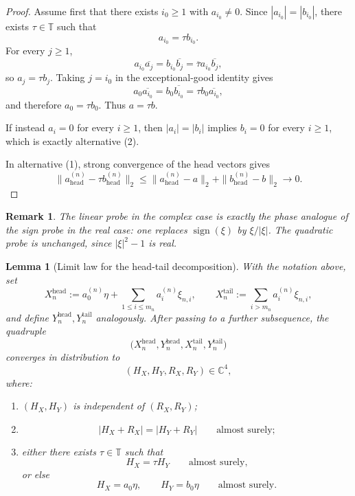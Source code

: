 \documentclass[11pt]{amsart}
\newtheorem{lemma}[theorem]{Lemma}
\newtheorem{remark}[theorem]{Remark}
\newcommand{\C}{\mathbb{C}}
\newcommand{\T}{\mathbb{T}}
\begin{document}
\begin{proof}
Assume first that there exists $i_0\ge 1$ with $a_{i_0}\ne 0$.  Since
$|a_{i_0}|=|b_{i_0}|$, there exists $\tau\in\T$ such that
\[
  a_{i_0}=\tau b_{i_0}.
\]
For every $j\ge 1$,
\[
  a_{i_0}\overline{a_j}
  =
  b_{i_0}\overline{b_j}
  =
  \overline{\tau}a_{i_0}\overline{b_j},
\]
so $a_j=\tau b_j$.  Taking $j=i_0$ in the exceptional-good identity gives
\[
  a_0\overline{a_{i_0}}
  =
  b_0\overline{b_{i_0}}
  =
  \tau b_0\overline{a_{i_0}},
\]
and therefore $a_0=\tau b_0$.  Thus $a=\tau b$.

If instead $a_i=0$ for every $i\ge 1$, then $|a_i|=|b_i|$ implies
$b_i=0$ for every $i\ge 1$, which is exactly alternative \textup{(2)}.

In alternative \textup{(1)}, strong convergence of the head vectors gives
\[
  \|a^{(n)}_{\mathrm{head}}-\tau b^{(n)}_{\mathrm{head}}\|_2
  \le
  \|a^{(n)}_{\mathrm{head}}-a\|_2
  +
  \|b^{(n)}_{\mathrm{head}}-b\|_2
  \longrightarrow 0.
\]
\end{proof}

\begin{remark}
The linear probe in the complex case is exactly the phase analogue of the sign
probe in the real case: one replaces $\operatorname{sign}(\xi)$ by
$\xi/|\xi|$.  The quadratic probe is unchanged, since $|\xi|^2-1$ is real.
\end{remark}

\begin{lemma}[Limit law for the head-tail decomposition]
\label{lem:limit-law}
With the notation above, set
\[
  X_n^{\mathrm{head}}
  :=
  a_0^{(n)}\eta+\sum_{1\le i\le m_n} a_i^{(n)}\xi_{n,i},
  \qquad
  X_n^{\mathrm{tail}}
  :=
  \sum_{i>m_n} a_i^{(n)}\xi_{n,i},
\]
and define $Y_n^{\mathrm{head}},Y_n^{\mathrm{tail}}$ analogously.  After
passing to a further subsequence, the quadruple
\[
  \bigl(
    X_n^{\mathrm{head}},
    Y_n^{\mathrm{head}},
    X_n^{\mathrm{tail}},
    Y_n^{\mathrm{tail}}
  \bigr)
\]
converges in distribution to
\[
  (H_X,H_Y,R_X,R_Y)\in\C^4,
\]
where:
\begin{enumerate}[label=\rm(\arabic*)]
\item $(H_X,H_Y)$ is independent of $(R_X,R_Y)$;
\item
\[
  |H_X+R_X|=|H_Y+R_Y|
  \qquad\text{almost surely;}
\]
\item either there exists $\tau\in\T$ such that
  \[
    H_X=\tau H_Y
    \qquad\text{almost surely,}
  \]
  or else
  \[
    H_X=a_0\eta,
    \qquad
    H_Y=b_0\eta
    \qquad\text{almost surely.}
  \]
\end{enumerate}
\end{lemma}
\end{document}
